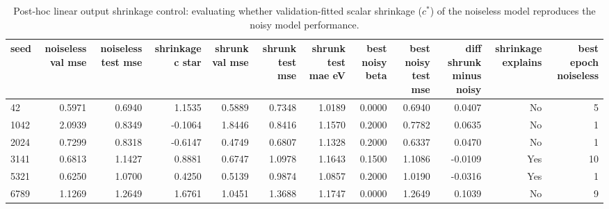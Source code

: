 \begin{table}[htbp]
\centering
\caption{Post-hoc linear output shrinkage control: evaluating whether validation-fitted scalar shrinkage ($c^*$) of the noiseless model reproduces the noisy model performance.}
\label{tab:shrinkage_control}
\begin{tabular}{lrrrrrrrrrrr}
\toprule
\textbf{seed} & \textbf{noiseless val mse} & \textbf{noiseless test mse} & \textbf{shrinkage c star} & \textbf{shrunk val mse} & \textbf{shrunk test mse} & \textbf{shrunk test mae eV} & \textbf{best noisy beta} & \textbf{best noisy test mse} & \textbf{diff shrunk minus noisy} & \textbf{shrinkage explains} & \textbf{best epoch noiseless} \\
\midrule
42 & 0.5971 & 0.6940 & 1.1535 & 0.5889 & 0.7348 & 1.0189 & 0.0000 & 0.6940 & 0.0407 & No & 5 \\
1042 & 2.0939 & 0.8349 & -0.1064 & 1.8446 & 0.8416 & 1.1570 & 0.2000 & 0.7782 & 0.0635 & No & 1 \\
2024 & 0.7299 & 0.8318 & -0.6147 & 0.4749 & 0.6807 & 1.1328 & 0.2000 & 0.6337 & 0.0470 & No & 1 \\
3141 & 0.6813 & 1.1427 & 0.8881 & 0.6747 & 1.0978 & 1.1643 & 0.1500 & 1.1086 & -0.0109 & Yes & 10 \\
5321 & 0.6250 & 1.0700 & 0.4250 & 0.5139 & 0.9874 & 1.0857 & 0.2000 & 1.0190 & -0.0316 & Yes & 1 \\
6789 & 1.1269 & 1.2649 & 1.6761 & 1.0451 & 1.3688 & 1.1747 & 0.0000 & 1.2649 & 0.1039 & No & 9 \\
\bottomrule
\end{tabular}
\end{table}
